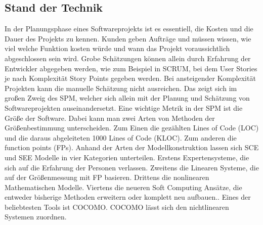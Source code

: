 \subsection{Stand der Technik}
In der Planungsphase eines Softwareprojekts ist es essentiell, die Kosten und die Dauer des Projekts zu kennen. Kunden geben Aufträge und müssen wissen, wie viel welche Funktion kosten würde und wann das Projekt voraussichtlich abgeschlossen sein wird. Grobe Schätzungen können allein durch Erfahrung der Entwickler abgegeben werden, wie zum Beispiel in SCRUM, bei dem User Stories je nach Komplexität Story Points gegeben werden. Bei ansteigender Komplexität Projekten kann die manuelle Schätzung nicht ausreichen. Das zeigt sich im großen Zweig des SPM, welcher sich allein mit der Planung und Schätzung von Softwareprojekten auseinandersetzt. Eine wichtige Metrik in der SPM ist die Größe der Software. Dabei kann man zwei Arten von Methoden der Größenbestimmung unterscheiden. Zum Einen die gezählten Lines of Code (LOC) und die daraus abgeleiteten 1000 Lines of Code (KLOC). Zum anderen die function points (FPs). Anhand der Arten der Modellkonstruktion lassen sich SCE und SEE Modelle in vier Kategorien unterteilen. Erstens Expertensysteme, die sich auf die Erfahrung der Personen verlassen\cite{Heemstra1992}. Zweitens die Linearen Systeme, die auf der Größenmessung mit FP basieren\cite{Matson1994}. Drittens die nonlinearen Mathematischen Modelle. Viertens die neueren Soft Computing Ansätze, die entweder bisherige Methoden erweitern oder komplett neu aufbauen\cite{Huang2007}.\cite{Huang2006}. Eines der beliebtesten Tools ist COCOMO.\cite{Jain2016} COCOMO lässt sich den nichtlinearen Systemen zuordnen.

